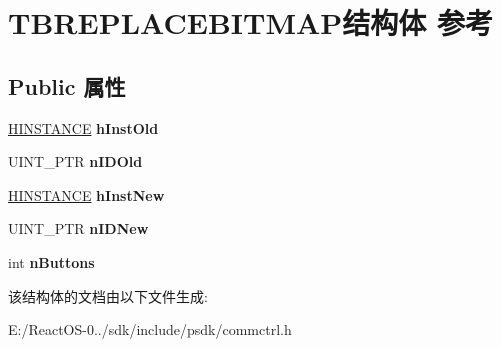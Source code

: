 \hypertarget{struct_t_b_r_e_p_l_a_c_e_b_i_t_m_a_p}{}\section{T\+B\+R\+E\+P\+L\+A\+C\+E\+B\+I\+T\+M\+A\+P结构体 参考}
\label{struct_t_b_r_e_p_l_a_c_e_b_i_t_m_a_p}
\subsection*{Public 属性}
\begin{DoxyCompactItemize}
\item 
\mbox{\label{struct_t_b_r_e_p_l_a_c_e_b_i_t_m_a_p_a95d2387ba249b2d8f4eb4f6b86c96a1f}} 
\hyperlink{interfacevoid}{H\+I\+N\+S\+T\+A\+N\+CE} {\bfseries h\+Inst\+Old}
\item 
\mbox{\label{struct_t_b_r_e_p_l_a_c_e_b_i_t_m_a_p_a4deecc99cd9d20d46b6cf360cda4ca68}} 
U\+I\+N\+T\+\_\+\+P\+TR {\bfseries n\+I\+D\+Old}
\item 
\mbox{\label{struct_t_b_r_e_p_l_a_c_e_b_i_t_m_a_p_af36763be1b569ac1d09742cc47e1f5ba}} 
\hyperlink{interfacevoid}{H\+I\+N\+S\+T\+A\+N\+CE} {\bfseries h\+Inst\+New}
\item 
\mbox{\label{struct_t_b_r_e_p_l_a_c_e_b_i_t_m_a_p_aee8589e804dc2a38ee9378a0bf1ebea2}} 
U\+I\+N\+T\+\_\+\+P\+TR {\bfseries n\+I\+D\+New}
\item 
\mbox{\label{struct_t_b_r_e_p_l_a_c_e_b_i_t_m_a_p_a065577585e54b65852f5d0e08b418819}} 
int {\bfseries n\+Buttons}
\end{DoxyCompactItemize}


该结构体的文档由以下文件生成\+:\begin{DoxyCompactItemize}
\item 
E\+:/\+React\+O\+S-\/0../sdk/include/psdk/commctrl.\+h\end{DoxyCompactItemize}
